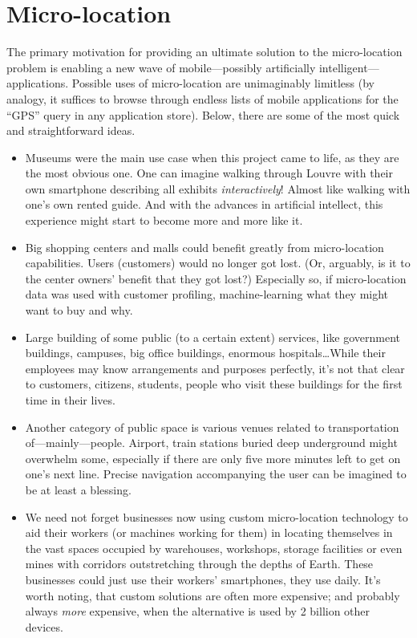 \chapter{Micro-location}
\label{cha:motivation}


The primary motivation for providing an ultimate solution to the micro-location problem is enabling a new wave of mobile---possibly artificially intelligent---applications. Possible uses of micro-location are unimaginably limitless (by analogy, it suffices to browse through endless lists of mobile applications for the ``GPS'' query in any application store). Below, there are some of the most quick and straightforward ideas.

\begin{itemize}
	\item Museums were the main use case when this project came to life, as they are the most obvious one. One can imagine walking through Louvre with their own smartphone describing all exhibits \emph{interactively}! Almost like walking with one's own rented guide. And with the advances in artificial intellect, this experience might start to become more and more like it.
	
	\item Big shopping centers and malls could benefit greatly from micro-location capabilities. Users (customers) would no longer got lost. (Or, arguably, is it to the center owners' benefit that they got lost?) Especially so, if micro-location data was used with customer profiling, machine-learning what they might want to buy and why.
	
	\item Large building of some public (to a certain extent) services, like government buildings, campuses, big office buildings, enormous hospitals\ldots While their employees may know arrangements and purposes perfectly, it's not that clear to customers, citizens, students, people who visit these buildings for the first time in their lives.
	
	\item Another category of public space is various venues related to transportation of---mainly---people. Airport, train stations buried deep underground might overwhelm some, especially if there are only five more minutes left to get on one's next line. Precise navigation accompanying the user can be imagined to be at least a blessing.

	\item We need not forget businesses now using custom micro-location technology to aid their workers (or machines working for them) in locating themselves in the vast spaces occupied by warehouses, workshops, storage facilities or even mines with corridors outstretching through the depths of Earth. These businesses could just use their workers' smartphones, they use daily. It's worth noting, that custom solutions are often more expensive; and probably always \emph{more} expensive, when the alternative is used by 2 billion other devices.
\end{itemize}

